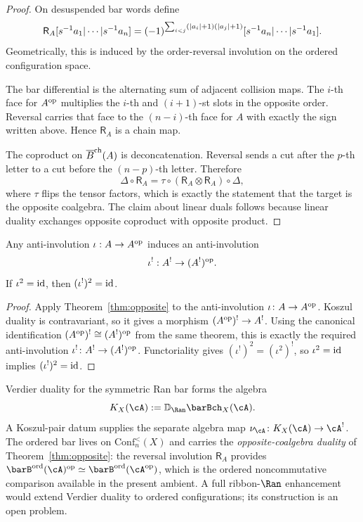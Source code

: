 \begin{proof}
On desuspended bar words define
\[
\mathsf{R}_A[s^{-1} a_1|\cdots|s^{-1} a_n]
=
(-1)^{\sum_{i<j}(|a_i|+1)(|a_j|+1)}
[s^{-1} a_n|\cdots|s^{-1} a_1].
\]
Geometrically, this is induced by the order-reversal involution on the ordered configuration space.

The bar differential is the alternating sum of adjacent collision maps. The $i$-th face for
$A^{\mathrm{op}}$ multiplies the $i$-th and $(i+1)$-st slots in the opposite order. Reversal carries that
face to the $(n-i)$-th face for $A$ with exactly the sign written above. Hence $\mathsf{R}_A$ is a
chain map.

The coproduct on $\overline{B}^{\mathrm{ch}}(A)$ is deconcatenation. Reversal sends a cut after the $p$-th letter to a
cut before the $(n-p)$-th letter. Therefore
\[
\Delta\circ\mathsf{R}_A
=
\tau\circ(\mathsf{R}_A\otimes\mathsf{R}_A)\circ\Delta,
\]
where $\tau$ flips the tensor factors, which is exactly the statement that the target is the
opposite coalgebra. The claim about linear duals follows because linear duality exchanges opposite
coproduct with opposite product.
\end{proof}

\begin{corollary}
\ClaimStatusProvedHere
\label{cor:anti}
Any anti-involution $\iota:A\to A^{\mathrm{op}}$ induces an anti-involution
\[
\iota^!:A^!\to (A^!)^{\mathrm{op}}.
\]
If $\iota^2=\mathrm{id}$, then $(\iota^!)^2=\mathrm{id}$.
\end{corollary}

\begin{proof}
Apply Theorem~\ref{thm:opposite} to the anti-involution
$\iota\colon A\to A^{\mathrm{op}}$.
Koszul duality is contravariant, so it gives a morphism
$(A^{\mathrm{op}})^!\to A^!$.
Using the canonical identification
$(A^{\mathrm{op}})^!\cong (A^!)^{\mathrm{op}}$ from the same theorem, this is exactly
the required anti-involution
$\iota^!\colon A^!\to (A^!)^{\mathrm{op}}$.
Functoriality gives
$(\iota^!)^2=(\iota^2)^!$, so $\iota^2=\mathrm{id}$ implies
$(\iota^!)^2=\mathrm{id}$.
\end{proof}

\begin{remark}
\label{rem:ordered-verdier-nonexistence-opposite}
Verdier duality for the symmetric Ran bar forms the algebra
\[
 K_X(\cA):=\mathbb D_{\Ran}\barBch_X(\cA).
\]
A Koszul-pair datum supplies the separate algebra map
\(\nu_\cA\colon K_X(\cA)\to\cA^!\).  The ordered bar lives on
$\mathrm{Conf}^<_n(X)$ and carries the
\emph{opposite-coalgebra duality}
of Theorem~\textup{\ref{thm:opposite}}: the reversal involution
$\mathsf{R}_A$ provides
$\barB^{\mathrm{ord}}(\cA)^{\mathrm{op}} \simeq
\barB^{\mathrm{ord}}(\cA^{\mathrm{op}})$,
which is the ordered noncommutative comparison available in the
present ambient.  A full ribbon-$\Ran$ enhancement would extend
Verdier duality to ordered configurations; its construction is an
open problem.
\end{remark}

